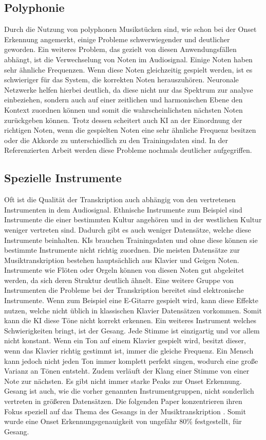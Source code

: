 \subsection{Polyphonie}
Durch die Nutzung von polyphonen Musikstücken sind, wie schon bei der Onset Erkennung angemerkt,
einige Probleme schwerwiegender und deutlicher geworden.
Ein weiteres Problem, das gezielt von diesen Anwendungsfällen abhängt, ist die Verwechselung von Noten im Audiosignal.
Einige Noten haben sehr ähnliche Frequenzen.
Wenn diese Noten gleichzeitig gespielt werden, ist es schwieriger für das System, die korrekten Noten herauszuhören.
Neuronale Netzwerke helfen hierbei deutlich, da diese nicht nur das Spektrum zur analyse einbeziehen,
sondern auch auf einer zeitlichen und harmonischen Ebene den Kontext zuordnen können
und somit die wahrscheinlichsten nächsten Noten zurückgeben können.
Trotz dessen scheitert auch KI an der Einordnung der richtigen Noten, wenn die gespielten Noten
eine sehr ähnliche Frequenz besitzen oder die Akkorde zu unterschiedlich zu den Trainingsdaten sind.
In der Referenzierten Arbeit \cite{martak2022balancing} werden diese Probleme nochmals deutlicher aufgegriffen.

\subsection{Spezielle Instrumente}
Oft ist die Qualität der Transkription auch abhängig von den vertretenen Instrumenten in dem Audiosignal.
Ethnische Instrumente zum Beispiel sind Instrumente die einer bestimmten Kultur angehören
und in der westlichen Kultur weniger vertreten sind.
Dadurch gibt es auch weniger Datensätze, welche diese Instrumente beinhalten.
KIs brauchen Trainingsdaten und ohne diese können sie bestimmte Instrumente nicht richtig zuordnen.
Die meisten Datensätze zur Musiktranskription bestehen hauptsächlich aus Klavier und Geigen Noten.
Instrumente wie Flöten oder Orgeln können von diesen Noten gut abgeleitet werden,
da sich deren Struktur deutlich ähnelt.
Eine weitere Gruppe von Instrumenten die Probleme bei der Transkription bereitet sind elektronische Instrumente.
Wenn zum Beispiel eine E-Gitarre gespielt wird, kann diese Effekte nutzen,
welche nicht üblich in klassischen Klavier Datensätzen vorkommen.
Somit kann die KI diese Töne nicht korrekt erkennen.
Ein weiteres Instrument welches Schwierigkeiten bringt, ist der Gesang.
Jede Stimme ist einzigartig und vor allem nicht konstant.
Wenn ein Ton auf einem Klavier gespielt wird, besitzt dieser,
wenn das Klavier richtig gestimmt ist, immer die gleiche Frequenz.
Ein Mensch kann jedoch nicht jeden Ton immer komplett perfekt singen, wodurch eine große Varianz an Tönen entsteht.
Zudem verläuft der Klang einer Stimme von einer Note zur nächsten.
Es gibt nicht immer starke Peaks zur Onset Erkennung.
Gesang ist auch, wie die vorher genannten Instrumentgruppen, nicht sonderlich vertreten in größeren Datensätzen.
Die folgenden Paper konzentrieren ihren Fokus speziell auf das Thema des Gesangs in der Musiktranskription \cite{gu2023deep,gu2024automatic}.
Somit wurde eine Onset Erkennungsgenauigkeit von ungefähr 80\% festgestellt, für Gesang.

